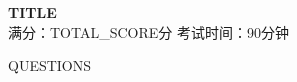 \documentclass[12pt,a4paper]{article}
\begin{document}
\begin{center}
\LARGE{\textbf{{TITLE}}}\\[0.3cm]
\large{满分：{TOTAL_SCORE}分 \quad 考试时间：90分钟}
\end{center}
\vspace{0.5cm}
{QUESTIONS}
\end{document}
